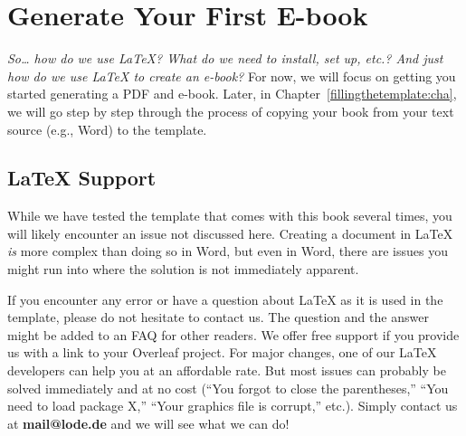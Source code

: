 


\chapter{Generate Your First E-book}
\label{generateyourfirstebook:cha}

\textit{So\dots{} how do we use LaTeX? What do we need to install, set up, etc.? And just how do we use LaTeX to create an e-book?} For now, we will focus on getting you started generating a PDF and e-book. Later, in Chapter~\ref{fillingthetemplate:cha}, we will go step by step through the process of copying your book from your text source (e.g., Word) to the template.

\section{LaTeX Support}
\label{latexhelp:sec}

While we have tested the template that comes with this book several times, you will likely encounter an issue not discussed here. Creating a document in LaTeX \textit{is} more complex than doing so in Word, but even in Word, there are issues you might run into where the solution is not immediately apparent.

If you encounter any error or have a question about LaTeX as it is used in the template, please do not hesitate to contact us. The question and the answer might be added to an FAQ for other readers. We offer free support if you provide us with a link to your Overleaf project. For major changes, one of our LaTeX developers can help you at an affordable rate. But most issues can probably be solved immediately and at no cost (``You forgot to close the parentheses,'' ``You need to load package X,'' ``Your graphics file is corrupt,'' etc.). Simply contact us at \textbf{mail@lode.de} and we will see what we can do!

